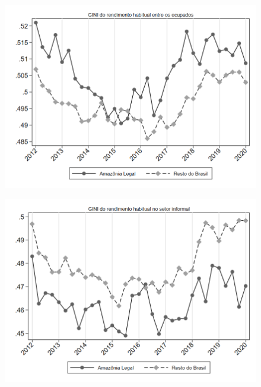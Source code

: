 \begin{frame}[label=_estrutura_renda_gini_ocupado]{}
\textit{\hyperlink{_estrutura_renda}{}}
\begin{figure}
  \centering
  \includegraphics[width=1.0\linewidth]{../../analysis/output/estrutura_renda/_estrutura_renda_gini_ocupado.png}
  \caption{}
  \label{fig:_estrutura_renda_gini_ocupado}
\end{figure}
\end{frame}

\begin{frame}[label=_estrutura_renda_gini_informal]{}
\textit{\hyperlink{_estrutura_renda}{}}
\begin{figure}
  \centering
  \includegraphics[width=1.0\linewidth]{../../analysis/output/estrutura_renda/_estrutura_renda_gini_informal.png}
  \caption{}
  \label{fig:_estrutura_renda_gini_informal}
\end{figure}
\end{frame}


